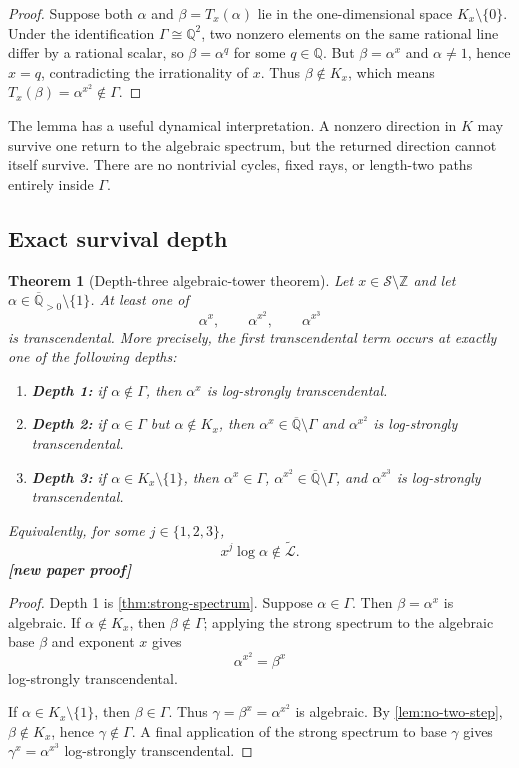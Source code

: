 \documentclass[11pt,oneside]{article}
\newtheorem{theorem}{Theorem}[section]
\theoremstyle{definition}
\theoremstyle{remark}
\newcommand{\Z}{\mathbb Z}
\newcommand{\Q}{\mathbb Q}
\newcommand{\Qbar}{\overline{\mathbb Q}}
\newcommand{\Apos}{\overline{\mathbb Q}_{>0}}
\newcommand{\Sol}{\mathcal S}
\newcommand{\LL}{\widetilde{\mathcal L}}
\newcommand{\statusnew}{\textcolor{NewViolet}{\textbf{[new paper proof]}}}
\begin{document}
\begin{proof}
Suppose both $\alpha$ and $\beta=T_x(\alpha)$ lie in the one-dimensional space
$K_x\setminus\{0\}$.  Under the identification $\Gamma\cong\Q^2$, two nonzero elements on the
same rational line differ by a rational scalar, so $\beta=\alpha^q$ for some $q\in\Q$.
But $\beta=\alpha^x$ and $\alpha\ne1$, hence $x=q$, contradicting the irrationality of $x$.
Thus $\beta\notin K_x$, which means $T_x(\beta)=\alpha^{x^2}\notin\Gamma$.
\end{proof}

The lemma has a useful dynamical interpretation.  A nonzero direction in $K$ may survive one
return to the algebraic spectrum, but the returned direction cannot itself survive.  There
are no nontrivial cycles, fixed rays, or length-two paths entirely inside $\Gamma$.

\subsection{Exact survival depth}

\begin{theorem}[Depth-three algebraic-tower theorem]\label{thm:depth-three}
Let $x\in\Sol\setminus\Z$ and let $\alpha\in\Apos\setminus\{1\}$.  At least one of
\[
  \alpha^x,\qquad \alpha^{x^2},\qquad \alpha^{x^3}
\]
is transcendental.  More precisely, the first transcendental term occurs at exactly one of
the following depths:

\begin{enumerate}
\item \textbf{Depth 1:} if $\alpha\notin\Gamma$, then $\alpha^x$ is log-strongly
      transcendental.
\item \textbf{Depth 2:} if $\alpha\in\Gamma$ but $\alpha\notin K_x$, then
      $\alpha^x\in\Qbar\setminus\Gamma$ and $\alpha^{x^2}$ is log-strongly transcendental.
\item \textbf{Depth 3:} if $\alpha\in K_x\setminus\{1\}$, then
      $\alpha^x\in\Gamma$, $\alpha^{x^2}\in\Qbar\setminus\Gamma$, and
      $\alpha^{x^3}$ is log-strongly transcendental.
\end{enumerate}

Equivalently, for some $j\in\{1,2,3\}$,
\[
  x^j\log\alpha\notin\LL.
\]
\statusnew
\end{theorem}

\begin{proof}
Depth 1 is \cref{thm:strong-spectrum}.  Suppose $\alpha\in\Gamma$.  Then
$\beta=\alpha^x$ is algebraic.  If $\alpha\notin K_x$, then $\beta\notin\Gamma$; applying the
strong spectrum to the algebraic base $\beta$ and exponent $x$ gives
\[
 \alpha^{x^2}=\beta^x
\]
log-strongly transcendental.

If $\alpha\in K_x\setminus\{1\}$, then $\beta\in\Gamma$.  Thus
$\gamma=\beta^x=\alpha^{x^2}$ is algebraic.  By \cref{lem:no-two-step},
$\beta\notin K_x$, hence $\gamma\notin\Gamma$.  A final application of the strong spectrum to
base $\gamma$ gives $\gamma^x=\alpha^{x^3}$ log-strongly transcendental.
\end{proof}
\end{document}

